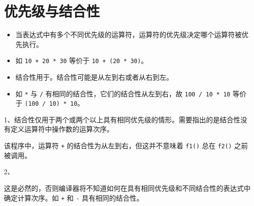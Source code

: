 \section{优先级与结合性}
\begin{frame}[fragile]\ft{\secname}
  
  \begin{itemize}
  \item 
    当表达式中有多个不同优先级的运算符，运算符的优先级决定哪个运算符被优先执行。\\[.1in]
  \item[] 如 \lstinline|10 + 20 * 30| 等价于 \lstinline|10 + (20 * 30)|。\\[.1in]
  \item 
    结合性用于。结合性可能是从左到右或者从右到左。\\[.1in]
  \item[]
    如 \lstinline|*| 与 \lstinline|/| 有相同的结合性，它们的结合性从左到右，故  \lstinline|100 / 10 * 10| 等价于 \lstinline|(100 / 10) * 10|。\\[.1in]
\end{itemize} \pause 

\end{frame}

\begin{frame}[fragile]\ft{\secname}
  1、结合性仅用于两个或两个以上具有相同优先级的情形。需要指出的是结合性没有定义运算符中操作数的运算次序。
\end{frame}

\begin{frame}\ft{\secname}  

\end{frame}

\begin{frame}[fragile]\ft{\secname}
该程序中，运算符 \lstinline|+| 的结合性为从左到右，但这并不意味着 \lstinline|f1()| 总在 \lstinline|f2()| 之前被调用。
\end{frame}

\begin{frame}[fragile]\ft{\secname}  
  2、
  \vspace{.1in}
  
  这是必然的，否则编译器将不知道如何在具有相同优先级和不同结合性的表达式中确定计算次序。如 \lstinline|+| 和 \lstinline|-| 具有相同的结合性。
\end{frame}

